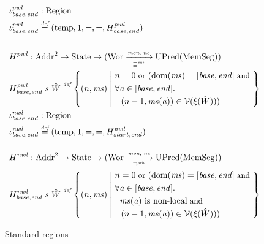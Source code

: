 \documentclass[compsoc,conference,letterpaper,fleqn]{IEEEtran}
\newcommand{\fun}{\rightarrow}
\newcommand{\defeq}{\stackrel{\textit{\tiny{def}}}{=}}
\DeclareMathOperator{\dom}{dom}
\newcommand{\var}[1]{\mathit{#1}}
\newcommand{\hs}{\var{ms}}
\newcommand{\ms}{\hs}
\newcommand{\addr}{\var{a}}
\newcommand{\start}{\var{base}}
\newcommand{\addrend}{\var{end}}
\newcommand{\nwl}{\var{nwl}}
\newcommand{\pwl}{\var{pwl}}
\newcommand{\futurewk}{\mathbin{\sqsupseteq}^{\var{pub}}}
\newcommand{\futurestr}{\mathbin{\sqsupseteq}^{\var{priv}}}
\newcommand{\monwknefun}{\xrightarrow[\text{\tiny{$\futurewk$}}]{\textit{\tiny{mon, ne}}}}
\newcommand{\monstrnefun}{\xrightarrow[\text{\tiny{$\futurestr$}}]{\textit{\tiny{mon, ne}}}}
\newcommand{\asmType}{\plaindom{AsmType}}
\newcommand{\plaindom}[1]{\mathrm{#1}}
\newcommand{\Addrs}{\plaindom{Addr}}
\newcommand{\HeapSegments}{\plaindom{MemSeg}}
\newcommand{\States}{\plaindom{State}}
\newcommand{\Regions}{\plaindom{Region}}
\newcommand{\Wor}{\plaindom{Wor}}
\newcommand{\UPred}[1]{\plaindom{UPred}(#1)}
\newcommand{\intr}[2]{\mathcal{#1}}
\newcommand{\valueintr}[1]{\intr{V}{#1}}
\newcommand{\stdvr}{\valueintr{\asmType}}
\newcommand{\npair}[2][n]{\left(#1,#2 \right)}
\newcommand{\plainview}[1]{\mathrm{#1}}
\newcommand{\temp}{\plainview{temp}}
\newcommand{\nonlocal}[1]{\ensuremath{#1} \text{ is non-local}}
\begin{document}
{\begin{figure}[htbp]
  \centering
  \begin{align*}
  &\iota_{\start,\addrend}^\pwl : \Regions\\
  &\iota_{\start,\addrend}^\pwl \defeq (\temp,1,=,=,H^\pwl_{\start,\addrend}) \\
  \\
  &H^\pwl : \Addrs^2 \fun \States \fun (\Wor \monwknefun \UPred{\HeapSegments})\\
  &H^\pwl_{\start,\addrend}\; s \; \hat{W} \defeq \left\{\npair{\hs} \; \middle| \;
    \begin{aligned}
      & n = 0 \text{\footnotesize{ or }} (\dom(\hs) = [\start,\addrend] \text{\footnotesize{ and }} \\
      &\forall \addr \in [\start,\addrend] \ldotp\\
      & \;\; \npair[n-1]{\hs(\addr)} \in \stdvr(\xi(\hat{W})))
    \end{aligned}
        \right\}\\
  &\iota_{\start,\addrend}^{\nwl} : \Regions \\
  &\iota_{\start,\addrend}^{\nwl} \defeq (\temp,1,=,=,H^\nwl_{start,\addrend}) \\
  \\
  &H^\nwl : \Addrs^2 \fun \States \fun (\Wor \monstrnefun \UPred{\HeapSegments})\\
  &H^\nwl_{\start,\addrend} \; s \;\hat{W} \defeq \left\{\npair{\hs} \; \middle| \;
    \begin{aligned}
      &n = 0 \text{\footnotesize{ or }} (\dom(\hs) = [\start,\addrend] \text{\footnotesize{ and }} \\
      &\forall \addr \in [\start,\addrend] \ldotp \\
      &\;\; \nonlocal{\ms(\addr)} \text{\footnotesize{ and }}\\ 
      &\;\; \npair[n-1]{\hs(\addr)} \in \stdvr(\xi(\hat{W})))
    \end{aligned}
        \right\}
\end{align*}
\caption{Standard regions}
\label{fig:standard-regions}
\end{figure}

}
\end{document}
